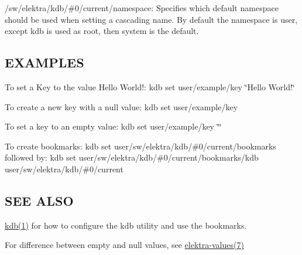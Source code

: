 \begin{DoxyItemize}
\item {\ttfamily /sw/elektra/kdb/\#0/current/namespace}\+: Specifies which default namespace should be used when setting a cascading name. By default the namespace is user, except {\ttfamily kdb} is used as root, then {\ttfamily system} is the default.
\end{DoxyItemize}

\subsection*{E\+X\+A\+M\+P\+L\+E\+S}

To set a Key to the value {\ttfamily Hello World!}\+: {\ttfamily kdb set user/example/key \char`\"{}\+Hello World!\char`\"{}}

To create a new key with a null value\+: {\ttfamily kdb set user/example/key}

To set a key to an empty value\+: {\ttfamily kdb set user/example/key \char`\"{}\char`\"{}}

To create bookmarks\+: {\ttfamily kdb set user/sw/elektra/kdb/\#0/current/bookmarks} followed by\+: {\ttfamily kdb set user/sw/elektra/kdb/\#0/current/bookmarks/kdb user/sw/elektra/kdb/\#0/current}

\subsection*{S\+E\+E A\+L\+S\+O}


\begin{DoxyItemize}
\item \hyperlink{md_doc_help_kdb_doc_help_kdb_md}{kdb(1)} for how to configure the kdb utility and use the bookmarks.
\item For difference between empty and null values, see \hyperlink{md_doc_help_elektra-values_doc_help_elektra-values_md}{elektra-\/values(7)} 
\end{DoxyItemize}